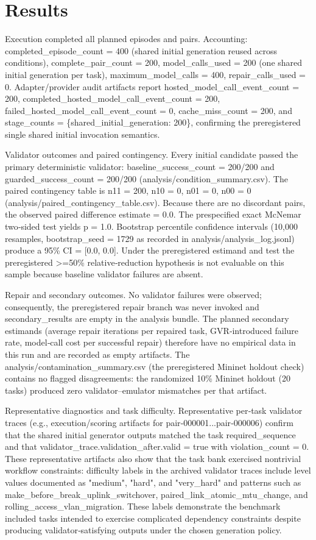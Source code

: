\documentclass[conference]{IEEEtran}
\begin{document}
\section{Results}
Execution completed all planned episodes and pairs. Accounting: completed\_episode\_count = 400 (shared initial generation reused across conditions), complete\_pair\_count = 200, model\_calls\_used = 200 (one shared initial generation per task), maximum\_model\_calls = 400, repair\_calls\_used = 0. Adapter/provider audit artifacts report hosted\_model\_call\_event\_count = 200, completed\_hosted\_model\_call\_event\_count = 200, failed\_hosted\_model\_call\_event\_count = 0, cache\_miss\_count = 200, and stage\_counts = \{shared\_initial\_generation: 200\}, confirming the preregistered single shared initial invocation semantics.

Validator outcomes and paired contingency. Every initial candidate passed the primary deterministic validator: baseline\_success\_count = 200/200 and guarded\_success\_count = 200/200 (analysis/condition\_summary.csv). The paired contingency table is n11 = 200, n10 = 0, n01 = 0, n00 = 0 (analysis/paired\_contingency\_table.csv). Because there are no discordant pairs, the observed paired difference estimate = 0.0. The prespecified exact McNemar two‑sided test yields p = 1.0. Bootstrap percentile confidence intervals (10,000 resamples, bootstrap\_seed = 1729 as recorded in analysis/analysis\_log.jsonl) produce a 95\% CI = [0.0, 0.0]. Under the preregistered estimand and test the preregistered >=50\% relative‑reduction hypothesis is not evaluable on this sample because baseline validator failures are absent.

Repair and secondary outcomes. No validator failures were observed; consequently, the preregistered repair branch was never invoked and secondary\_results are empty in the analysis bundle. The planned secondary estimands (average repair iterations per repaired task, GVR‑introduced failure rate, model‑call cost per successful repair) therefore have no empirical data in this run and are recorded as empty artifacts. The analysis/contamination\_summary.csv (the preregistered Mininet holdout check) contains no flagged disagreements: the randomized 10\% Mininet holdout (20 tasks) produced zero validator--emulator mismatches per that artifact.

Representative diagnostics and task difficulty. Representative per‑task validator traces (e.g., execution/scoring artifacts for pair‑000001...pair‑000006) confirm that the shared initial generator outputs matched the task required\_sequence and that validator\_trace.validation\_after.valid = true with violation\_count = 0. These representative artifacts also show that the task bank exercised nontrivial workflow constraints: difficulty labels in the archived validator traces include level values documented as "medium", "hard", and "very\_hard" and patterns such as make\_before\_break\_uplink\_switchover, paired\_link\_atomic\_mtu\_change, and rolling\_access\_vlan\_migration. These labels demonstrate the benchmark included tasks intended to exercise complicated dependency constraints despite producing validator‑satisfying outputs under the chosen generation policy.
\end{document}
